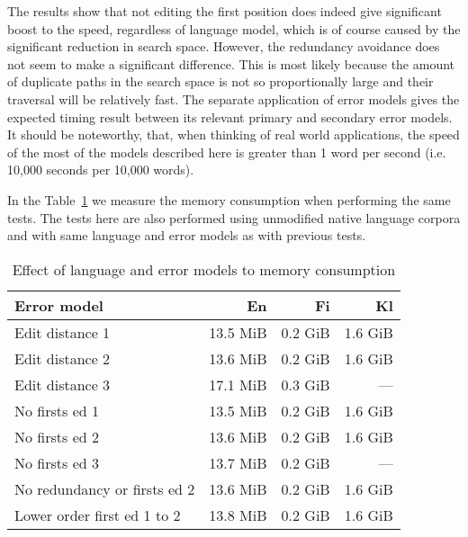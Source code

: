 \documentclass[11pt]{article}
\begin{document}
The results show that not editing the first position does indeed give
significant boost to the speed, regardless of language model, which is of course
caused by the significant reduction in search space. However, the
redundancy avoidance does not seem to make a significant difference. This is most
likely because the amount of duplicate paths in the search space is not so
proportionally large and their traversal will be relatively fast. The separate
application of error models gives the expected timing result between its
relevant primary and secondary error models. It should be noteworthy, that, when
thinking of real world applications, the speed of the most of the models
described here is greater than 1 word per second (i.e. 10,000 seconds per 10,000
words).


In the Table~\ref{table:error-model-vs-language-memory} we measure the memory
consumption when performing the same tests. The tests here are also performed
using unmodified native language corpora and with same language and error
models as with previous tests.

\begin{table}[h]
\begin{center}
\begin{scriptsize}
\begin{tabular}{|l|rrr|}
\hline
\bf Error model & \bf En & \bf Fi & \bf Kl \\ 
\hline
Edit distance 1 &
13.5 MiB&0.2 GiB&1.6 GiB
\\
Edit distance 2 &
13.6 MiB&0.2 GiB&1.6 GiB
\\
Edit distance 3 &
17.1 MiB&0.3 GiB&---
\\
No firsts ed 1 & 
13.5 MiB&0.2 GiB&1.6 GiB
\\
No firsts ed 2 &
13.6 MiB&0.2 GiB&1.6 GiB
\\
No firsts ed 3 &
13.7 MiB&0.2 GiB&---
\\
No redundancy or firsts ed 2 &
13.6 MiB&0.2 GiB&1.6 GiB
\\
Lower order first ed 1 to 2 &
13.8 MiB&0.2 GiB&1.6 GiB
\\
\hline
\end{tabular}
\end{scriptsize}
\end{center}
\caption{\label{table:error-model-vs-language-memory} Effect of language and 
error models to memory consumption}
\end{table}
\end{document}
